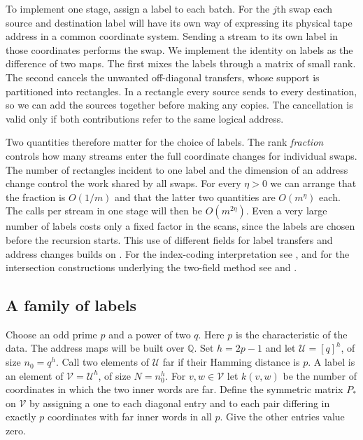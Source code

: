 To implement one stage, assign a label to each batch. For the $j$th
swap each source and destination label will have its own way of
expressing its physical tape address in a common coordinate system.
Sending a stream to its own label in those coordinates performs the
swap. We implement the identity on labels as the difference of two
maps. The first mixes the labels through a matrix of small rank. The
second cancels the unwanted off-diagonal transfers, whose support is
partitioned into rectangles. In a rectangle every source sends to
every destination, so we can add the sources together before making
any copies. The cancellation is valid only if both contributions
refer to the same logical address.

Two quantities therefore matter for the choice of labels. The
rank \emph{fraction} controls how many streams enter the full
coordinate changes for individual swaps. The number of rectangles
incident to one label and the dimension of an address change control
the work shared by all swaps. For every $\eta>0$ we can arrange that
the fraction is $O(1/m)$ and that the latter two quantities are
$O(m^\eta)$ each. The calls per stream in one stage will then be
$O(m^{2\eta})$. Even a very large number of labels costs only a fixed factor in the
scans, since the labels are chosen before the recursion starts. This use of different fields for
label transfers and address changes builds on \cite{Tape}. For the
index-coding interpretation see
\cite{BarYossefBirkJayramKol2006,Lubetzky}, and for the intersection
constructions underlying the two-field method see
\cite{FranklWilson1981,Alon1998,Matousek2010} and
\cite[Section~1.6]{Tape}.

\subsection{A family of labels}

Choose an odd prime $p$ and a power of two $q$. Here $p$ is the
characteristic of the data. The address maps will be built over
$\mathbb Q$. Set $h=2p-1$ and let $\mathcal U=[q]^h$, of size
$n_0=q^h$. Call two elements of $\mathcal U$ far if their Hamming
distance is $p$. A label is an element of
$\mathcal V=\mathcal U^h$, of size $N=n_0^h$. For $v,w\in\mathcal V$
let $k(v,w)$ be the number of coordinates in which the two inner words
are far. Define the symmetric matrix $P_*$ on $\mathcal V$ by assigning
a one to each diagonal entry and to each pair differing in exactly $p$
coordinates with far inner words in all $p$. Give the other entries
value zero.

